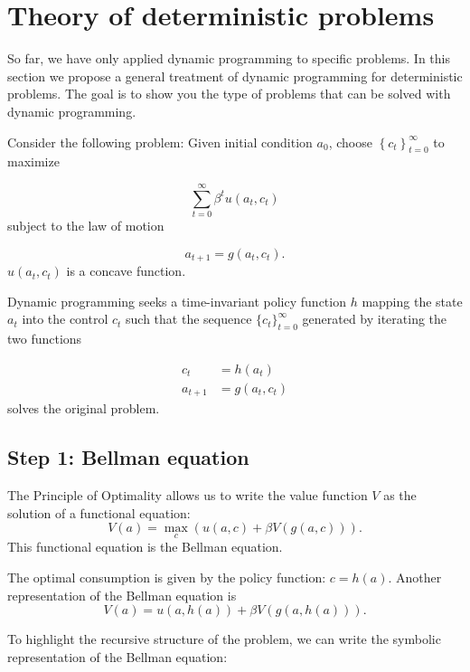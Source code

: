 \documentclass{article}
\begin{document}
\setcounter{section}{3}
\section{Theory of deterministic problems}\label{sec:theory}\wcSpan*[id=ref-sec-theory]{}

So far, we have only applied dynamic programming to specific problems. In this section we propose a general treatment of dynamic programming for deterministic problems. The goal is to show you the type of problems that can be solved with dynamic programming.

Consider the following problem: Given initial condition $a_{0}$, choose $\left\lbrace c_{t}\right\rbrace _{t=0}^{\infty}$ to maximize

\[
\sum_{t=0}^{\infty}\beta^{t} u(a_{t},c_{t})
\]
subject to the law of motion

\[
a_{t+1}=g(a_{t},c_{t}).
\]
$u(a_{t},c_{t})$ is a concave function. 

Dynamic programming seeks a time-invariant policy function $h$ mapping the state $a_{t}$ into the control $c_{t}$ such that the sequence
$\lbrace c_{t}\rbrace _{t=0}^{\infty}$ generated by iterating the two functions

\[
\begin{align*}
c_{t} & =h(a_{t})\\
a_{t+1} & =g(a_{t},c_{t})
\end{align*}
\]
solves the original problem.

\subsection{Step 1: Bellman equation}

The Principle of Optimality allows us to write the value function $V$ as the solution of a functional equation:
\wcSpan*[id=equation-33]{}
\setcounter{tpequation}{32}\label{e:bellmansymb}
\[
V(a)=\max_{c}\left(u(a,c)+\beta V(g(a,c))\right).\tag{33}
\]
This functional equation is the Bellman equation.\wcTpRef*[href=^principle-of-optimality]{} 

The optimal consumption is given by the policy function: $c=h(a)$. Another representation of the Bellman equation is 
\wcSpan*[id=equation-34]{}
\setcounter{tpequation}{33}\label{e:bellmansymb2}
\[
V(a)=u(a,h(a))+\beta V(g(a,h(a))).\tag{34}
\]

To highlight the recursive structure of the problem, we can write the symbolic representation of the Bellman equation:
\end{document}
